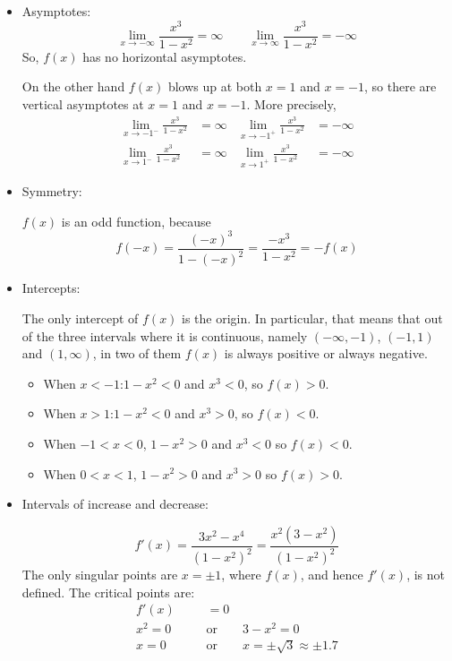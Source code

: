\begin{solution}
\begin{itemize}
\item Asymptotes:
\[\lim_{x \to -\infty}\frac{x^3}{1-x^2}=\infty \qquad
\lim_{x \to \infty}\frac{x^3}{1-x^2}=-\infty \]
So, $f(x)$ has no horizontal asymptotes.

 On the other hand $f(x)$ blows up at both $x=1$
and $x=-1$, so there are vertical asymptotes at $x=1$ and $x=-1$.
More precisely,
\begin{align*}
\lim_{x \to -1^-}\frac{x^3}{1-x^2}&=\infty
&
\lim_{x \to -1^+}\frac{x^3}{1-x^2}&=-\infty\\
\lim_{x \to 1^-}\frac{x^3}{1-x^2}&=\infty
&
\lim_{x \to 1^+}\frac{x^3}{1-x^2}&=-\infty
\end{align*}

\item Symmetry:

$f(x)$ is an odd function, because
\[f(-x)=\frac{(-x)^3}{1-(-x)^2}=\frac{-x^3}{1-x^2}=-f(x)\]

\item Intercepts:

The only intercept of $f(x)$ is the origin. In particular, that means that out of the three intervals where it is continuous,
                  namely $(-\infty,-1)$, $(-1,1)$ and $(1,\infty)$, in two of them $f(x)$ is always positive or always negative.
\begin{itemize}
\item When $x<-1$:\quad $1-x^2<0$ and $x^3<0$, so $f(x)>0$.
\item When $x>1$:\qquad $1-x^2<0$ and $x^3>0$, so $f(x)<0$.
\item When $-1<x<0$, $1-x^2>0$ and $x^3<0$ so $f(x)<0$.
\item When $0<x<1$, $1-x^2>0$ and $x^3>0$ so $f(x)>0$.
\end{itemize}

\item Intervals of increase and decrease:

\[f'(x)=\dfrac{3x^2-x^4}{(1-x^2)^2}=\frac{x^2(3-x^2)}{(1-x^2)^2}\]
The only singular points are $x=\pm 1$, where $f(x)$, and hence $f'(x)$, is not defined. The critical points are:
\begin{align*}
f'(x)&=0\\
x^2=0\qquad&\mbox{or}\qquad 3-x^2=0\\
x=0\qquad&\mbox{or}\qquad x=\pm\sqrt{3}\approx\pm 1.7
\end{align*}


\end{itemize}
\end{solution}
